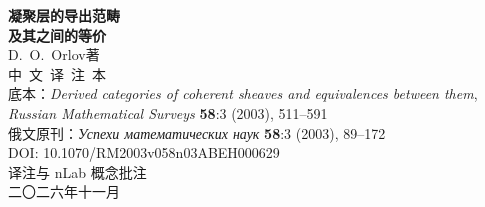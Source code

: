 \thispagestyle{empty}
\begin{center}
\vspace*{2.6cm}
{\Huge\bfseries 凝聚层的导出范畴}\\[0.5em]
{\Huge\bfseries 及其之间的等价}\\[1.6em]
{\large D.~O.~Orlov\quad 著}\\[1.2em]
{\large 中\ 文\ 译\ 注\ 本}\\[4.5em]
{\small 底本：\emph{Derived categories of coherent sheaves and equivalences between them},}\\
{\small \emph{Russian Mathematical Surveys} \textbf{58}:3 (2003), 511--591}\\[0.4em]
{\small 俄文原刊：{\cyrfont\itshape Успехи математических наук} \textbf{58}:3 (2003), 89--172}\\[0.4em]
{\small DOI: 10.1070/RM2003v058n03ABEH000629}\\[4.5em]
{\small 译注与 nLab 概念批注}\\[0.4em]
{\small 二〇二六年十一月}
\end{center}
\clearpage
